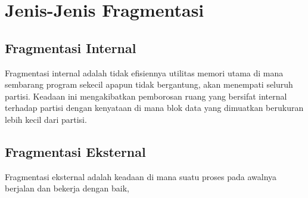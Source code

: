 \section{Jenis-Jenis Fragmentasi}
\subsection{Fragmentasi Internal}
Fragmentasi internal adalah tidak efisiennya utilitas memori utama di mana sembarang program sekecil apapun tidak bergantung, akan menempati seluruh partisi. Keadaan ini mengakibatkan pemborosan ruang yang bersifat internal terhadap partisi dengan kenyataan di mana blok data yang dimuatkan berukuran lebih kecil dari partisi.\cite{pangera2005sistem}
\subsection{Fragmentasi Eksternal}
Fragmentasi eksternal adalah keadaan di mana suatu proses pada awalnya berjalan dan bekerja dengan baik,